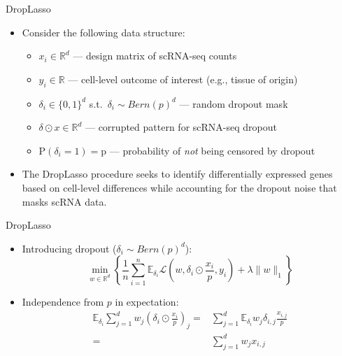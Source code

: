 \documentclass{beamer}
\newcommand{\R}{\mathbb{R}}
\newcommand{\E}{\mathbb{E}}
\newcommand{\lik}{\mathcal{L}}
\begin{document}
\begin{frame}{DropLasso}

\begin{itemize}
  \itemsep12pt
  \item Consider the following data structure:
    \begin{itemize}
      \itemsep10pt
      \item $x_i \in \mathbb{R}^d$ --- design matrix of scRNA-seq counts
      \item $y_i \in \mathbb{R}$ --- cell-level outcome of interest (e.g.,
        tissue of origin)
      \item $\delta_i \in \{0, 1\}^d$ s.t.~$\delta_i \sim Bern(p)^d$ --- random
        dropout mask
      \item $\delta \odot x \in \mathbb{R}^d$ --- corrupted pattern for
        scRNA-seq dropout
      \item $\text{P}(\delta_i = 1) = \text{p}$ --- probability of \textit{not}
        being censored by dropout
    \end{itemize}
  \item The DropLasso procedure seeks to identify differentially expressed genes
    based on cell-level differences while accounting for the dropout noise that
    masks scRNA data.
\end{itemize}

\end{frame}


\begin{frame}{DropLasso}

\begin{itemize}
  \itemsep12pt
  \item Introducing dropout ($\delta_i \sim Bern(p)^d$):
    \[
      \min_{w \in \R^d} \left\{ \frac{1}{n} \sum_{i = 1}^n \E_{\delta_i}
        \lik \left(w, \delta_i \odot \frac{x_i}{p}, y_i \right) + \lambda
        \lVert w \rVert_1 \right\}
    \]
  \item Independence from $p$ in expectation:
    \[
      \begin{aligned}
      \E_{\delta_i} \sum_{j = 1}^{d} w_j \left( \delta_i \odot \frac{x_i}{p}
      \right)_j =& \sum_{j = 1}^d \E_{\delta_i} w_j \delta_{i,j}
      \frac{x_{i,j}}{p} \\ =& \sum_{j = 1}^d w_j x_{i,j}
      \end{aligned}
    \]
\end{itemize}

\end{frame}
\end{document}
